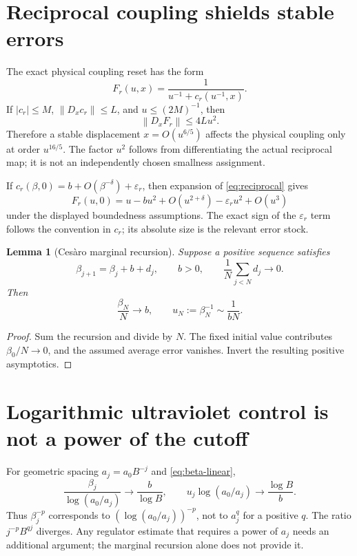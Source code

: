 \documentclass[11pt,oneside,openany]{book}
\newtheorem{lemma}[lemma]{Lemma}
\theoremstyle{definition}
\theoremstyle{remark}
\newcommand{\norm}[1]{\left\lVert#1\right\rVert}
\newcommand{\src}[2]{\cite[#2]{#1}}
\begin{document}
\section{Reciprocal coupling shields stable errors}
The exact physical coupling reset has the form
\begin{equation}\label{eq:reciprocal}
F_r(u,x)=\frac1{u^{-1}+c_r(u^{-1},x)}.
\end{equation}
If $|c_r|\le M$, $\norm{D_xc_r}\le L$, and $u\le(2M)^{-1}$, then
\begin{equation}\label{eq:shield}
\norm{D_xF_r}\le4Lu^2.
\end{equation}
Therefore a stable displacement $x=O(u^{6/5})$ affects the physical coupling only at order $u^{16/5}$. The factor $u^2$ follows from differentiating the actual reciprocal map; it is not an independently chosen smallness assignment.

If $c_r(\beta,0)=b+O(\beta^{-\delta})+\varepsilon_r$, then expansion of \cref{eq:reciprocal} gives
\[
F_r(u,0)=u-bu^2+O(u^{2+\delta})-\varepsilon_r u^2+O(u^3)
\]
under the displayed boundedness assumptions. The exact sign of the $\varepsilon_r$ term follows the convention in $c_r$; its absolute size is the relevant error stock. \src{F9}{V12--V14}

\begin{lemma}[Ces\`aro marginal recursion]\label{lem:cesaro-beta}
Suppose a positive sequence satisfies
\[
\beta_{j+1}=\beta_j+b+d_j,\qquad b>0,
\qquad \frac1N\sum_{j<N}d_j\longrightarrow0.
\]
Then
\begin{equation}\label{eq:beta-linear}
\frac{\beta_N}{N}\longrightarrow b,\qquad
u_N:=\beta_N^{-1}\sim\frac1{bN}.
\end{equation}
\end{lemma}
\begin{proof}
Sum the recursion and divide by $N$. The fixed initial value contributes $\beta_0/N\to0$, and the assumed average error vanishes. Invert the resulting positive asymptotics.
\end{proof}

\section{Logarithmic ultraviolet control is not a power of the cutoff}
For geometric spacing $a_j=a_0B^{-j}$ and \cref{eq:beta-linear},
\begin{equation}\label{eq:clock}
\frac{\beta_j}{\log(a_0/a_j)}\longrightarrow\frac b{\log B},
\qquad
u_j\log(a_0/a_j)\longrightarrow\frac{\log B}{b}.
\end{equation}
Thus $\beta_j^{-p}$ corresponds to $(\log(a_0/a_j))^{-p}$, not to $a_j^q$ for a positive $q$. The ratio $j^{-p}B^{qj}$ diverges. Any regulator estimate that requires a power of $a_j$ needs an additional argument; the marginal recursion alone does not provide it.
\end{document}
